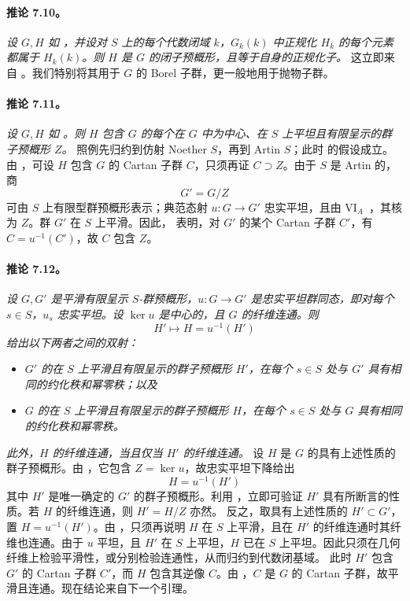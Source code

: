 \paragraph{\textbf{推论 7.10。}}
\emph{设 \(G,H\) 如 ，并设对 \(S\) 上的每个代数闭域 \(k\)，\(G_k(k)\) 中正规化 \(H_k\) 的每个元素都属于 \(H_k(k)\)。则 \(H\) 是 \(G\) 的闭子预概形，且等于自身的正规化子。}
这立即来自 。我们特别将其用于 \(G\) 的 Borel 子群，更一般地用于抛物子群。
\paragraph{\textbf{推论 7.11。}}
\emph{设 \(G,H\) 如 。则 \(H\) 包含 \(G\) 的每个在 \(G\) 中为中心、在 \(S\) 上平坦且有限呈示的群子预概形 \(Z\)。}
照例先归约到仿射 Noether \(S\)，再到 Artin \(S\)；此时  的假设成立。由 ，可设 \(H\) 包含 \(G\) 的 Cartan 子群 \(C\)，只须再证 \(C\supset Z\)。由于 \(S\) 是 Artin 的，商
\[
  G'=G/Z
\]
可由 \(S\) 上有限型群预概形表示；典范态射 \(u:G\to G'\) 忠实平坦，且由 VI\(_A\)~，其核为 \(Z\)。群 \(G'\) 在 \(S\) 上平滑。因此， 表明，对 \(G'\) 的某个 Cartan 子群 \(C'\)，有 \(C=u^{-1}(C')\)，故 \(C\) 包含 \(Z\)。
\paragraph{\textbf{推论 7.12。}}
\emph{设 \(G,G'\) 是平滑有限呈示 \(S\)-群预概形，\(u:G\to G'\) 是忠实平坦群同态，即对每个 \(s\in S\)，\(u_s\) 忠实平坦。设 \(\ker u\) 是中心的，且 \(G\) 的纤维连通。则}
\[
  H'\longmapsto H=u^{-1}(H')
\]
\emph{给出以下两者之间的双射：}
\begin{itemize}
\item \emph{\(G'\) 的在 \(S\) 上平滑且有限呈示的群子预概形 \(H'\)，在每个 \(s\in S\) 处与 \(G'\) 具有相同的约化秩和幂零秩；以及}
\item \emph{\(G\) 的在 \(S\) 上平滑且有限呈示的群子预概形 \(H\)，在每个 \(s\in S\) 处与 \(G\) 具有相同的约化秩和幂零秩。}
\end{itemize}
\emph{此外，\(H\) 的纤维连通，当且仅当 \(H'\) 的纤维连通。}
设 \(H\) 是 \(G\) 的具有上述性质的群子预概形。由 ，它包含 \(Z=\ker u\)，故忠实平坦下降给出
\[
  H=u^{-1}(H')
\]
其中 \(H'\) 是唯一确定的 \(G'\) 的群子预概形。利用 ，立即可验证 \(H'\) 具有所断言的性质。若 \(H\) 的纤维连通，则 \(H'=H/Z\) 亦然。
反之，取具有上述性质的 \(H'\subset G'\)，置 \(H=u^{-1}(H')\)。由 ，只须再说明 \(H\) 在 \(S\) 上平滑，且在 \(H'\) 的纤维连通时其纤维也连通。由于 \(u\) 平坦，且 \(H'\) 在 \(S\) 上平坦，\(H\) 已在 \(S\) 上平坦。因此只须在几何纤维上检验平滑性，或分别检验连通性，从而归约到代数闭基域。
此时 \(H'\) 包含 \(G'\) 的 Cartan 子群 \(C'\)，而 \(H\) 包含其逆像 \(C\)。由 ，\(C\) 是 \(G\) 的 Cartan 子群，故平滑且连通。现在结论来自下一个引理。
